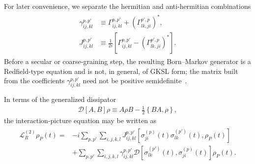 \documentclass[prx,aps,twocolumn,article]{revtex4-2}
\begin{document}
For later convenience, we separate the hermitian and anti-hermitian
combinations
\begin{align}
\begin{aligned}
    \gamma_{ij,kl}^{p,p'}
    &\equiv
    \Gamma_{ij,kl}^{p,p'}
    +
    \left(
        \Gamma_{lk,ji}^{p',p}
    \right)^*,
    \\
    J_{ij,kl}^{p,p'}
    &\equiv
    \frac{1}{2i}
    \left[
        \Gamma_{ij,kl}^{p,p'}
        -
        \left(
            \Gamma_{lk,ji}^{p',p}
        \right)^*
    \right].
\end{aligned}
\label{Eq:EffCoefsME}
\end{align}
Before a secular or coarse-graining step, the resulting Born--Markov generator is a Redfield-type equation and is not, in general, of GKSL form; the matrix built from the coefficients
$\gamma_{ij,kl}^{p,p'}$ need not be positive
semidefinite~\cite{Schaller:2008,Trushechkin:2021}.

In terms of the generalized dissipator
\begin{align}
    \mathcal D[A,B]\rho
    \equiv
    A\rho B
    -
    \frac{1}{2}
    \left\{
        BA,\rho
    \right\},
\end{align}
the interaction-picture equation may be written as
\begin{align}
\begin{aligned}
    \mathcal L_R^{(2)}\rho_P(t)
    ={}&
    -i
    \sum_{p,p'}
    \sum_{i,j,k,l}
    J_{ij,kl}^{p,p'}
    \left[
        \sigma_{ji}^{(p)}(t)
        \sigma_{lk}^{(p')}(t),
        \rho_P(t)
    \right]
    \\
    &+
    \sum_{p,p'}
    \sum_{i,j,k,l}
    \gamma_{ij,kl}^{p,p'}
    \mathcal D\!\left[
        \sigma_{lk}^{(p')}(t),
        \sigma_{ji}^{(p)}(t)
    \right]
    \rho_P(t).
\end{aligned}
\label{Eq:RedfieldCompact}
\end{align}
\end{document}
